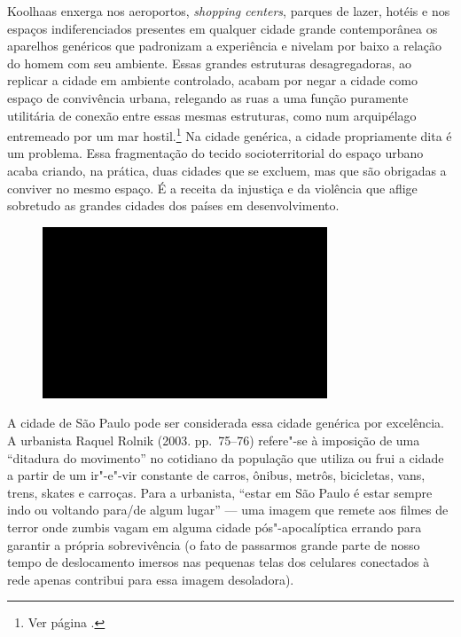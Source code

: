 Koolhaas enxerga nos aeroportos, \emph{shopping centers}, parques de lazer,
hotéis e nos espaços indiferenciados presentes em qualquer cidade grande
contemporânea os aparelhos genéricos que padronizam a experiência e
nivelam por baixo a relação do homem com seu ambiente. Essas grandes
estruturas desagregadoras, ao replicar a cidade em ambiente controlado, acabam por negar a cidade
como espaço de convivência urbana, relegando as ruas a uma função
puramente utilitária de conexão entre essas mesmas estruturas, como num
arquipélago entremeado por um mar hostil.\footnote{Ver página \pageref{hotel}.} Na cidade genérica, a cidade
propriamente dita é um problema. Essa fragmentação do tecido
socioterritorial do espaço urbano acaba criando, na prática, duas
cidades que se excluem, mas que são obrigadas a conviver no mesmo
espaço. É a receita da injustiça e da violência que aflige sobretudo as
grandes cidades dos países em desenvolvimento.

\begin{figure}[!ht]

\centering
 \includegraphics[width=85mm]{./imgs/im1.jpg}
\caption{\tiny{}}

\end{figure}

A cidade de São Paulo pode ser considerada essa cidade genérica por
excelência. A urbanista Raquel Rolnik (2003. pp.~75--76) refere"-se à imposição de uma
``ditadura do movimento'' no cotidiano da população que utiliza ou frui
a cidade a partir de um ir"-e"-vir constante de carros, ônibus, metrôs,
bicicletas, vans, trens, skates e carroças. Para a urbanista, ``estar em
São Paulo é estar sempre indo ou voltando para/de algum lugar'' --- uma
imagem que remete aos filmes de terror onde zumbis vagam em alguma
cidade pós"-apocalíptica errando para garantir a própria sobrevivência (o
fato de passarmos grande parte de nosso tempo de deslocamento imersos
nas pequenas telas dos celulares conectados à rede apenas contribui para
essa imagem desoladora).

